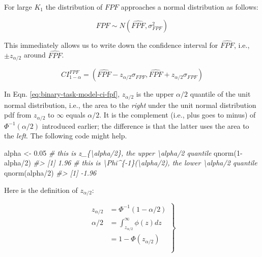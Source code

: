 \documentclass[
]{book}
\newenvironment{Shaded}{\begin{snugshade}}{\end{snugshade}}
\newcommand{\CommentTok}[1]{\textcolor[rgb]{0.56,0.35,0.01}{\textit{#1}}}
\newcommand{\DecValTok}[1]{\textcolor[rgb]{0.00,0.00,0.81}{#1}}
\newcommand{\FloatTok}[1]{\textcolor[rgb]{0.00,0.00,0.81}{#1}}
\newcommand{\FunctionTok}[1]{\textcolor[rgb]{0.00,0.00,0.00}{#1}}
\newcommand{\NormalTok}[1]{#1}
\newcommand{\OtherTok}[1]{\textcolor[rgb]{0.56,0.35,0.01}{#1}}
\newcommand{\SpecialCharTok}[1]{\textcolor[rgb]{0.00,0.00,0.00}{#1}}
\begin{document}
For large \(K_1\) the distribution of \(FPF\) approaches a normal distribution as follows:

\[FPF \sim N\left ( \widehat{FPF}, \sigma_{FPF}^2 \right )\]

This immediately allows us to write down the confidence interval for \(\widehat{FPF}\), i.e., \(\pm z_{\alpha/2}\) around \(\widehat{FPF}\).

\begin{equation} 
CI_{1-\alpha}^{FPF}=\left ( \widehat{FPF} - z_{\alpha/2} \sigma_{FPF}, \widehat{FPF} + z_{\alpha/2} \sigma_{FPF} \right )
\label{eq:binary-task-model-ci-fpf}
\end{equation}

In Eqn. \eqref{eq:binary-task-model-ci-fpf}, \(z_{\alpha/2}\) is the upper \(\alpha/2\) quantile of the unit normal distribution, i.e., the area to the \emph{right} under the unit normal distribution pdf from \(z_{\alpha/2}\) to \(\infty\) equals \(\alpha/2\). It is the complement (i.e., plus goes to minus) of \(\Phi^{-1}(\alpha/2)\) introduced earlier; the difference is that the latter uses the area to the \emph{left}. The following code might help.

\begin{Shaded}
\begin{Highlighting}[]
\NormalTok{alpha }\OtherTok{\textless{}{-}} \FloatTok{0.05}
\CommentTok{\# this is z\_\{\textbackslash{}alpha/2\}, the upper \textbackslash{}alpha/2 quantile}
\FunctionTok{qnorm}\NormalTok{(}\DecValTok{1}\SpecialCharTok{{-}}\NormalTok{alpha}\SpecialCharTok{/}\DecValTok{2}\NormalTok{) }
\CommentTok{\#\textgreater{} [1] 1.96}
\CommentTok{\# this is \textbackslash{}Phi\^{}\{{-}1\}(\textbackslash{}alpha/2), the lower \textbackslash{}alpha/2 quantile}
\FunctionTok{qnorm}\NormalTok{(alpha}\SpecialCharTok{/}\DecValTok{2}\NormalTok{)   }
\CommentTok{\#\textgreater{} [1] {-}1.96}
\end{Highlighting}
\end{Shaded}

Here is the definition of \(z_{\alpha/2}\):

\begin{equation} 
\left.
\begin{aligned} 
z_{\alpha/2} &=\Phi^{-1}\left ( 1-\alpha/2 \right )\\
\alpha/2&=\int_{z_{\alpha/2}}^{\infty}\phi(z)dz\\ 
&= 1-\Phi(z_{\alpha/2})\\
\\
\end{aligned}
\right \} 
\label{eq:binary-task-model-def-z-alpha2}
\end{equation}
\end{document}
